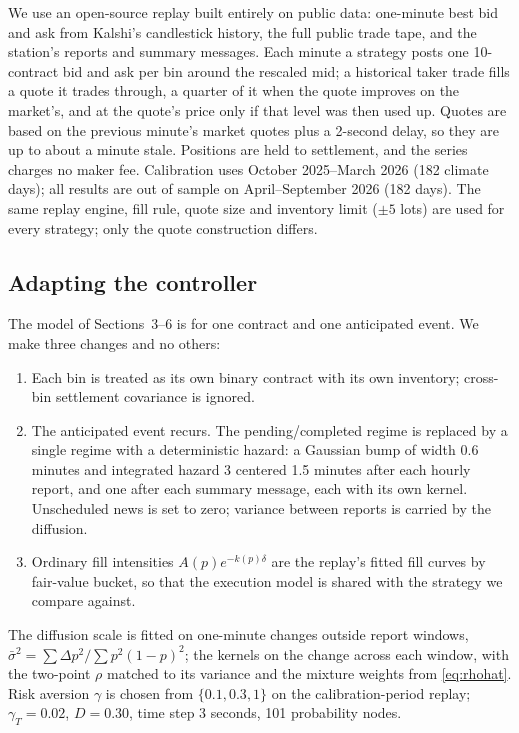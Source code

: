 \documentclass[11pt]{article}
\newcommand{\1}{\mathbf 1}
\begin{document}
We use an open-source replay built entirely on public data: one-minute best bid and ask
from Kalshi's candlestick history, the full public trade tape, and the
station's reports and summary messages. Each minute a strategy posts one
10-contract bid and ask per bin around the rescaled mid; a historical taker
trade fills a quote it trades through, a quarter of it when the quote improves
on the market's, and at the quote's price only if that level was then used up.
Quotes are based on the previous minute's market quotes plus a 2-second delay,
so they are up to about a minute stale. Positions are held to settlement, and the
series charges no maker fee. Calibration uses October 2025--March 2026 (182
climate days); all results are out of sample on April--September 2026 (182 days).
The same replay engine, fill rule, quote size and inventory limit ($\pm5$ lots) are
used for every strategy; only the quote construction differs.

\subsection{Adapting the controller}
The model of Sections~3--6 is for one contract and one anticipated event. We
make three changes and no others:
\begin{enumerate}
 \item Each bin is treated as its own binary contract with its own inventory;
 cross-bin settlement covariance is ignored.
 \item The anticipated event recurs. The pending/completed regime is replaced by
 a single regime with a deterministic hazard: a Gaussian bump of width $0.6$ minutes and
 integrated hazard $3$ centered 1.5 minutes after each hourly report, and one after
 each summary message, each with its own kernel. Unscheduled news is set to zero;
 variance between reports is carried by the diffusion.
 \item Ordinary fill intensities $A(p)e^{-k(p)\delta}$ are the replay's fitted
 fill curves by fair-value bucket, so that the execution model is shared with
 the strategy we compare against.
\end{enumerate}
The diffusion scale is fitted on one-minute changes outside report windows,
$\bar\sigma^2=\sum\Delta p^2/\sum p^2(1-p)^2$; the kernels on the change across
each window, with the two-point $\rho$ matched to its variance and the mixture
weights from \eqref{eq:rhohat}. Risk aversion $\gamma$ is chosen from
$\{0.1,0.3,1\}$ on the calibration-period replay; $\gamma_T=0.02$, $D=0.30$, time
step 3 seconds, 101 probability nodes.
\end{document}
